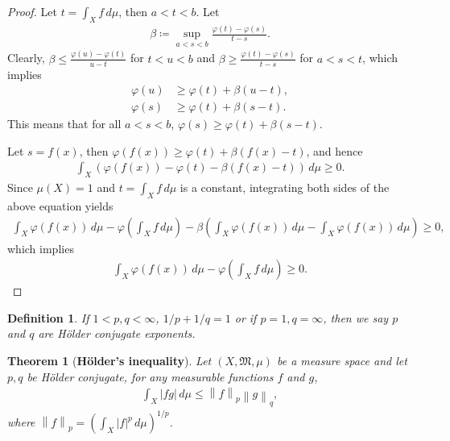 \documentclass[11pt]{book}
\newtheorem{definition}{Definition}[chapter]
\newtheorem{theorem}{Theorem}[chapter]
\theoremstyle{definition}
\numberwithin{equation}{chapter}
\begin{document}
\begin{proof}
Let $t = \int_X f\,d\mu$, then $a < t < b$. Let
\begin{align*}
    \beta \coloneqq \sup_{a < s < b} \frac{\varphi(t) - \varphi(s)}{t - s}.
\end{align*}
Clearly, $\beta \leq \frac{\varphi(u) - \varphi(t)}{u - t}$ for $t < u < b$ and $\beta \geq \frac{\varphi(t) - \varphi(s)}{t - s}$ for $a < s < t$, which implies
\begin{align*}
    \varphi(u) & \geq \varphi(t) + \beta(u - t), \\
    \varphi(s) & \geq \varphi(t) + \beta(s - t).
\end{align*}
This means that for all $a < s < b$, $\varphi(s) \geq \varphi(t) + \beta(s - t)$. 

Let $s = f(x)$, then $\varphi(f(x)) \geq \varphi(t) + \beta (f(x) - t)$, and hence
\begin{align*}
    \int_X \left(\varphi(f(x)) - \varphi(t) - \beta (f(x) - t)\right)\,d\mu \geq 0.
\end{align*}
Since $\mu(X) = 1$ and $t = \int_X f\,d\mu$ is a constant, integrating both sides of the above equation yields
\begin{align*}
    \int_X \varphi(f(x))\,d\mu - \varphi\left(\int_X f\,d\mu\right) - \beta \left(\int_X \varphi(f(x))\,d\mu - \int_X \varphi(f(x))\,d\mu\right) \geq 0,
\end{align*}
which implies
\begin{align*}
    \int_X \varphi(f(x))\,d\mu - \varphi\left(\int_X f\,d\mu\right) \geq 0.
\end{align*}
\end{proof}

\medskip

\begin{definition}
If $1 < p,q < \infty$, $1/p + 1/q = 1$ or if $p = 1, q = \infty$, then we say $p$ and $q$ are Hölder conjugate exponents. 
\end{definition}

\medskip

\begin{theorem}[{\bf Hölder's inequality}]\label{theorem_42}
Let $(X,\mathfrak{M},\mu)$ be a measure space and let $p, q$ be Hölder conjugate, for any measurable functions $f$ and $g$,
\begin{align*}
    \int_X \left|fg\right|\,d\mu \leq \left\|f\right\|_p \left\|g\right\|_q, 
\end{align*}
where $\left\|f\right\|_p = \left(\int_X \left|f\right|^p \,d\mu\right)^{1/p}$.
\end{theorem}
\end{document}

